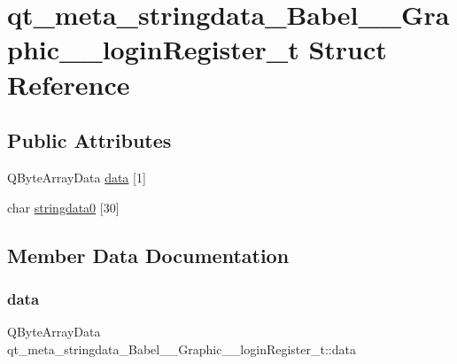 \hypertarget{structqt__meta__stringdata__Babel____Graphic____loginRegister__t}{}\section{qt\+\_\+meta\+\_\+stringdata\+\_\+\+Babel\+\_\+\+\_\+\+Graphic\+\_\+\+\_\+login\+Register\+\_\+t Struct Reference}
\label{structqt__meta__stringdata__Babel____Graphic____loginRegister__t}
\subsection*{Public Attributes}
\begin{DoxyCompactItemize}
\item 
Q\+Byte\+Array\+Data \hyperlink{structqt__meta__stringdata__Babel____Graphic____loginRegister__t_aedbd06a8de37ac11655f928a8baf4084}{data} \mbox{[}1\mbox{]}
\item 
char \hyperlink{structqt__meta__stringdata__Babel____Graphic____loginRegister__t_aff867bd79f1462973e95ea8c52c23118}{stringdata0} \mbox{[}30\mbox{]}
\end{DoxyCompactItemize}


\subsection{Member Data Documentation}
\mbox{\label{structqt__meta__stringdata__Babel____Graphic____loginRegister__t_aedbd06a8de37ac11655f928a8baf4084}} 
\subsubsection{\texorpdfstring{data}{data}}
{\footnotesize\ttfamily Q\+Byte\+Array\+Data qt\+\_\+meta\+\_\+stringdata\+\_\+\+Babel\+\_\+\+\_\+\+Graphic\+\_\+\+\_\+login\+Register\+\_\+t\+::data}


